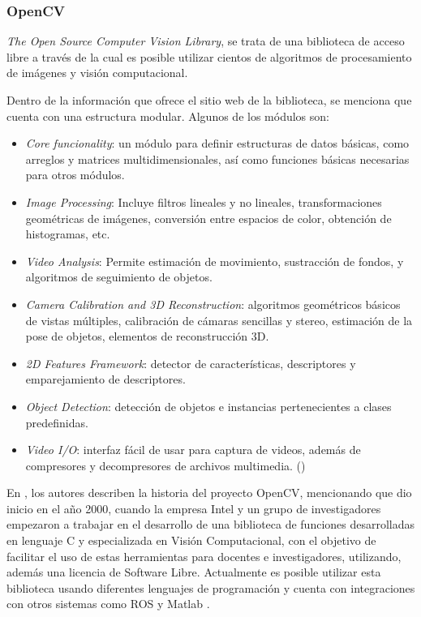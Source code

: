             
            \subsubsection{OpenCV}
            \textit{The Open Source Computer Vision Library}, se trata de una biblioteca de acceso libre a través de la cual es posible utilizar cientos de algoritmos de procesamiento de imágenes y visión computacional.
            
            Dentro de la información que ofrece el sitio web de la biblioteca, se menciona que cuenta con una estructura modular. Algunos de los módulos son:
            \begin{itemize}
                \item \textit{Core funcionality}: un módulo para definir estructuras de datos básicas, como arreglos y matrices multidimensionales, así como funciones básicas necesarias para otros módulos.
                \item \textit{Image Processing}: Incluye filtros lineales y no lineales, transformaciones geométricas de imágenes, conversión entre espacios de color, obtención de histogramas, etc.
                \item \textit{Video Analysis}: Permite estimación de movimiento, sustracción de fondos, y algoritmos de seguimiento de objetos. 
                \item \textit{Camera Calibration and 3D Reconstruction}: algoritmos geométricos básicos de vistas múltiples, calibración de cámaras sencillas y stereo, estimación de la pose de objetos, elementos de reconstrucción 3D.
                \item \textit{2D Features Framework}: detector de características, descriptores y emparejamiento de descriptores. 
                \item \textit{Object Detection}: detección de objetos e instancias pertenecientes a clases predefinidas.
                \item \textit{Video I/O}: interfaz fácil de usar para captura de videos, además de compresores y decompresores de archivos multimedia. (\cite*{OpvenCV-website})
            \end{itemize}

            En \cite{arevalo_librerivision_nodate}, los autores describen la historia del proyecto OpenCV, mencionando que dio inicio en el año 2000, cuando la empresa Intel y un grupo de investigadores empezaron a trabajar en el desarrollo de una biblioteca de funciones desarrolladas en lenguaje C y especializada en Visión Computacional, con el objetivo de facilitar el uso de estas herramientas para docentes e investigadores, utilizando, además una licencia de Software Libre. 
            Actualmente es posible utilizar esta biblioteca usando diferentes lenguajes de programación y cuenta con integraciones con otros sistemas como ROS y Matlab \textregistered.

